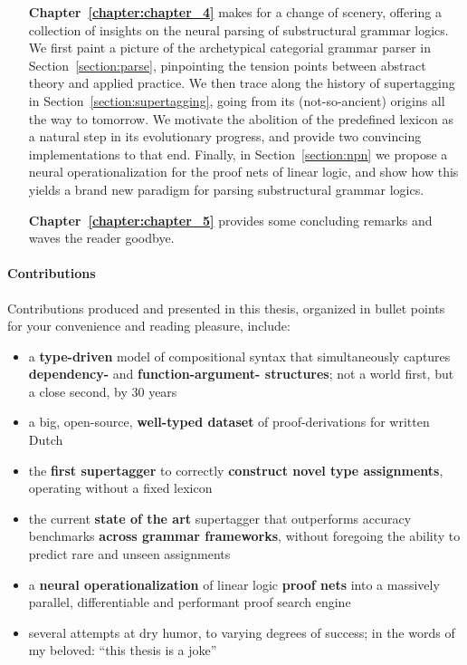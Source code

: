 {\begin{enumerate}[labelindent=2pt, itemindent=30pt, labelsep=5pt, widest=Chapter III,align=right,itemsep=5pt]
\item[\textbf{Chapter~\ref{chapter:chapter_4}}] makes for a change of scenery, offering a collection of insights on the neural parsing of substructural grammar logics.
We first paint a picture of the archetypical categorial grammar parser in Section~\ref{section:parse}, pinpointing the tension points between abstract theory and applied practice.
We then trace along the history of supertagging in Section~\ref{section:supertagging}, going from its (not-so-ancient) origins all the way to tomorrow.
We motivate the abolition of the predefined lexicon as a natural step in its evolutionary progress, and provide two convincing implementations to that end.
Finally, in Section~\ref{section:npn} we propose a neural operationalization for the proof nets of linear logic, and show how this yields a brand new paradigm for parsing substructural grammar logics.
\item[\textbf{Chapter~\ref{chapter:chapter_5}}] provides some concluding remarks and waves the reader goodbye.
\end{enumerate}

\paragraph{Contributions}
Contributions produced and presented in this thesis, organized in bullet points for your convenience and reading pleasure, include:
\begin{itemize}
\item a \textbf{type-driven} model of compositional syntax that simultaneously captures \textbf{dependency-} and \textbf{function-argument- structures}; not a world first, but a close second, by 30 years
\item a big, open-source, \textbf{well-typed dataset} of proof-derivations for written Dutch
\item the \textbf{first supertagger} to correctly \textbf{construct novel type assignments}, operating without a fixed lexicon
\item the current \textbf{state of the art} supertagger that outperforms accuracy benchmarks \textbf{across grammar frameworks}, without foregoing the ability to predict rare and unseen assignments
\item a \textbf{neural operationalization} of linear logic \textbf{proof nets} into a massively parallel, differentiable and performant proof search engine
\item several attempts at dry humor, to varying degrees of success; in the words of my beloved: ``this thesis is a joke''
\end{itemize}


}
